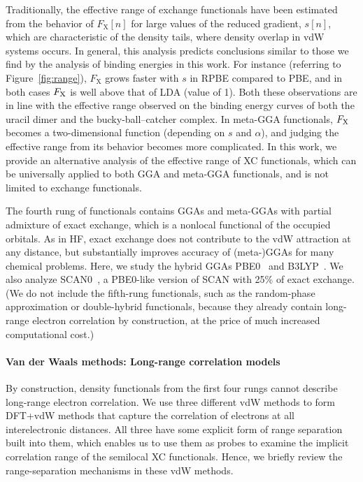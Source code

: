 Traditionally, the effective range of exchange functionals have been estimated from the behavior of $F_\text{X}[n]$ for large values of the reduced gradient, $s[n]$, which are characteristic of the density tails, where density overlap in vdW systems occurs.
In general, this analysis predicts conclusions similar to those we find by the analysis of binding energies in this work.
For instance (referring to Figure~\ref{fig:range}), $F_\text{X}$ grows faster with $s$ in RPBE compared to PBE, and in both cases $F_\text X$ is well above that of LDA (value of 1).
Both these observations are in line with the effective range observed on the binding energy curves of both the uracil dimer and the bucky-ball--catcher complex.
In meta-GGA functionals, $F_\text X$ becomes a two-dimensional function (depending on $s$ and $\alpha$), and judging the effective range from its behavior becomes more complicated.
In this work, we provide an alternative analysis of the effective range of XC functionals, which can be universally applied to both GGA and meta-GGA functionals, and is not limited to exchange functionals.

The fourth rung of functionals contains GGAs and meta-GGAs with partial admixture of exact exchange, which is a nonlocal functional of the occupied orbitals.
As in HF, exact exchange does not contribute to the vdW attraction at any distance, but substantially improves accuracy of (meta-)GGAs for many chemical problems. %
Here, we study the hybrid GGAs PBE0~\cite{PerdewJCP96,AdamoJCP99} and B3LYP~\cite{BeckeJCP93}.
We also analyze SCAN0~\cite{HuiJCP16}, a PBE0-like version of SCAN with 25\% of exact exchange.
(We do not include the fifth-rung functionals, such as the random-phase approximation or double-hybrid functionals, because they already contain long-range electron correlation by construction, at the price of much increased computational cost.)

\paragraph{Van der Waals methods: Long-range correlation models}

By construction, density functionals from the first four rungs cannot describe long-range electron correlation.
We use three different vdW methods to form DFT+vdW methods that capture the correlation of electrons at all interelectronic distances.
All three have some explicit form of range separation built into them, which enables us to use them as probes to examine the implicit correlation range of the semilocal XC functionals.
Hence, we briefly review the range-separation mechanisms in these vdW methods.

